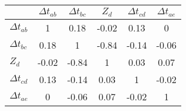 \begin{tabular}{|l|c|c|c|c|c|}
\hline
&\textbf{$\Delta{t}_{ab}$}&\textbf{$\Delta{t}_{bc}$}&\textbf{$Z_d$}&\textbf{$\Delta{t}_{cd}$}&\textbf{$\Delta{t}_{ae}$}\\\hline
\textbf{$\Delta{t}_{ab}$}&1&0.18&-0.02&0.13&0\\\hline
\textbf{$\Delta{t}_{bc}$}&0.18&1&-0.84&-0.14&-0.06\\\hline
\textbf{$Z_d$}&-0.02&-0.84&1&0.03&0.07\\\hline
\textbf{$\Delta{t}_{cd}$}&0.13&-0.14&0.03&1&-0.02\\\hline
\textbf{$\Delta{t}_{ae}$}&0&-0.06&0.07&-0.02&1\\\hline
\end{tabular}
